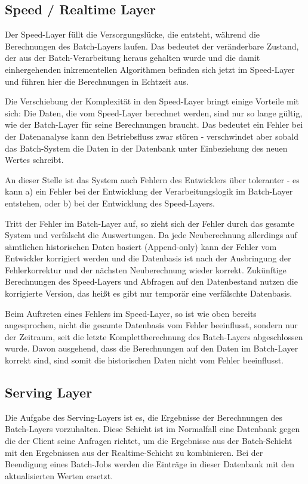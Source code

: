 \documentclass[a4paper,11pt]{scrartcl}
\begin{document}
  \subsection{Speed / Realtime Layer}
  Der Speed-Layer füllt die Versorgungslücke, die entsteht, während die
  Berechnungen des Batch-Layers laufen. Das bedeutet der veränderbare Zustand,
  der aus der Batch-Verarbeitung heraus gehalten wurde und die damit
  einhergehenden inkrementellen Algorithmen befinden sich jetzt im Speed-Layer
  und führen hier die Berechnungen in Echtzeit aus.

  Die Verschiebung der Komplexität in den Speed-Layer bringt einige Vorteile mit
  sich: Die Daten, die vom Speed-Layer berechnet werden, sind nur so lange
  gültig, wie der Batch-Layer für seine Berechnungen braucht. Das bedeutet ein
  Fehler bei der Datenanalyse kann den Betriebsfluss zwar stören - verschwindet
  aber sobald das Batch-System die Daten in der Datenbank unter Einbeziehung des
  neuen Wertes schreibt.

  An dieser Stelle ist das System auch Fehlern des Entwicklers über toleranter -
  es kann a) ein Fehler bei der Entwicklung der Verarbeitungslogik im
  Batch-Layer entstehen, oder b) bei der Entwicklung des Speed-Layers.

  Tritt der Fehler im Batch-Layer auf, so zieht sich der Fehler durch das
  gesamte System und verfälscht die Auswertungen. Da jede Neuberechnung
  allerdings auf sämtlichen historischen Daten basiert (Append-only) kann der
  Fehler vom Entwickler korrigiert werden und die Datenbasis ist nach der
  Ausbringung der Fehlerkorrektur und der nächsten Neuberechnung wieder
  korrekt. Zukünftige Berechnungen des Speed-Layers und Abfragen auf den
  Datenbestand nutzen die korrigierte Version, das heißt es gibt nur temporär
  eine verfälschte Datenbasis.

  Beim Auftreten eines Fehlers im Speed-Layer, so ist wie oben bereits
  angesprochen, nicht die gesamte Datenbasis vom Fehler beeinflusst, sondern nur
  der Zeitraum, seit die letzte Komplettberechnung des Batch-Layers abgeschlossen
  wurde. Davon ausgehend, dass die Berechnungen auf den Daten im Batch-Layer
  korrekt sind, sind somit die historischen Daten nicht vom Fehler beeinflusst.

  \subsection{Serving Layer}

  Die Aufgabe des Serving-Layers ist es, die Ergebnisse der Berechnungen des
  Batch-Layers vorzuhalten. Diese Schicht ist im Normalfall eine Datenbank
  gegen die der Client seine Anfragen richtet, um die Ergebnisse aus der
  Batch-Schicht mit den Ergebnissen aus der Realtime-Schicht zu kombinieren.
  Bei der Beendigung eines Batch-Jobs werden die Einträge in dieser Datenbank
  mit den aktualisierten Werten ersetzt.
\end{document}
